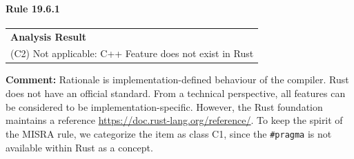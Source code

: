 \paragraph{Rule 19.6.1}
\begin{longtable}{p{13cm}}
\textbf{Analysis Result} \\
(C2) Not applicable: C++ Feature does not exist in Rust \\
\end{longtable}
\textbf{Comment:} Rationale is implementation-defined behaviour of the \Cpp compiler. Rust does not have an official standard. From a technical perspective, all features can be considered to be implementation-specific. However, the Rust foundation maintains a reference \url{https://doc.rust-lang.org/reference/}. To keep the spirit of the MISRA rule, we categorize the item as class C1, since the \texttt{\#pragma} is not available within Rust as a concept. \\
